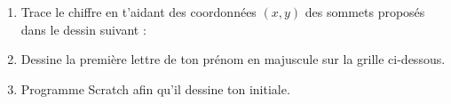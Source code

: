 \documentclass[class=report,crop=false, 12pt]{standalone}
\begin{document}
\begin{activite}
\begin{enumerate}
  \item Trace le chiffre \og {} \fg{} en t'aidant des coordonnées $(x,y)$ des sommets proposés dans le dessin suivant : 
  

  \item Dessine la première lettre de ton prénom en majuscule sur la grille ci-dessous.

  
  \item Programme Scratch afin qu'il dessine ton initiale.
  
  
\end{enumerate}


\end{activite}
\vfill\eject
\end{document}
